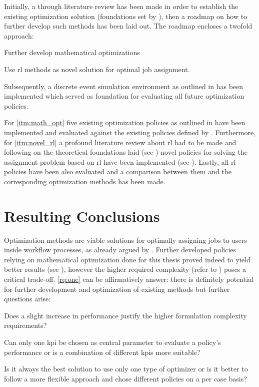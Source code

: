 Initially, a through literature review has been made in order to establish the existing optimization solution (\ie foundations set by \citet{Zeng2005}), then a roadmap on how to further develop such methods has been laid out. The roadmap encloses a twofold approach:
\begin{enumerate*}[ref=Approach \Roman*]
 	\item Further develop mathematical optimizations \label{itm:math_opt}
 	\item Use \gls{rl} methods as novel solution for optimal job assignment. \label{itm:novel_rl}
 \end{enumerate*} 

Subsequently, a discrete event simulation environment as outlined in  has been implemented which served as foundation for evaluating all future optimization policies.

For \ref{itm:math_opt} five existing optimization policies as outlined in  have been implemented and evaluated against the existing policies defined by \citet[pp. 13--14]{Zeng2005}. Furthermore, for \ref{itm:novel_rl} a profound literature review about \gls{rl} had to be made and following on the theoretical foundations laid (see ) novel policies for solving the assignment problem based on \gls{rl} have been implemented (see ). Lastly, all \gls{rl} policies have been also evaluated and a comparison between them and the corresponding optimization methods has been made.

\section{Resulting Conclusions}

Optimization methods are viable solutions for optimally assigning jobs to users inside workflow processes, as already argued by \citet{Zeng2005}. Further developed policies relying on mathematical optimization done for this thesis proved indeed to yield better results (see ), however the higher required complexity (refer to ) poses a critical trade-off. \ref{rq:one} can be affirmatively answer: there is definitely potential for further development and optimization of existing methods but further questions arise:
\begin{enumerate*}
	\item Does a slight increase in performance justify the higher formulation complexity requirements?
	\item Can only one \gls{kpi} be chosen as central parameter to evaluate a policy's performance or is a combination of different \glspl{kpi} more suitable?
	\item Is it always the best solution to use only one type of optimizer or is it better to follow a more flexible approach and chose different policies on a per case basis?
\end{enumerate*}

